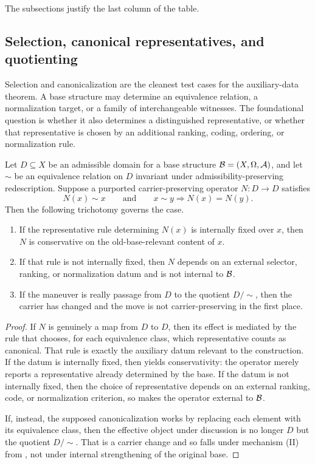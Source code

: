 The subsections justify the last column of the table.

\subsection{Selection, canonical representatives, and quotienting}

Selection and canonicalization are the cleanest test cases for the auxiliary-data theorem. A base structure may determine an equivalence relation, a normalization target, or a family of interchangeable witnesses. The foundational question is whether it also determines a distinguished representative, or whether that representative is chosen by an additional ranking, coding, ordering, or normalization rule.

\begin{proposition}\label{prop:case-canonicalization}
Let $D\subseteq X$ be an admissible domain for a base structure $\mathcal{B}=(X,\Omega,\mathcal{A})$, and let $\sim$ be an equivalence relation on $D$ invariant under admissibility-preserving redescription. Suppose a purported carrier-preserving operator $N:D\to D$ satisfies
\[
N(x)\sim x \qquad\text{and}\qquad x\sim y \Rightarrow N(x)=N(y).
\]
Then the following trichotomy governs the case.
\begin{enumerate}[label=(\alph*)]
    \item If the representative rule determining $N(x)$ is internally fixed over $x$, then $N$ is conservative on the old-base-relevant content of $x$.
    \item If that rule is not internally fixed, then $N$ depends on an external selector, ranking, or normalization datum and is not internal to $\mathcal{B}$.
    \item If the maneuver is really passage from $D$ to the quotient $D/{\sim}$, then the carrier has changed and the move is not carrier-preserving in the first place.
\end{enumerate}
\end{proposition}

\begin{proof}
If $N$ is genuinely a map from $D$ to $D$, then its effect is mediated by the rule that chooses, for each equivalence class, which representative counts as canonical. That rule is exactly the auxiliary datum relevant to the construction. If the datum is internally fixed, then  yields conservativity: the operator merely reports a representative already determined by the base. If the datum is not internally fixed, then the choice of representative depends on an external ranking, code, or normalization criterion, so  makes the operator external to $\mathcal{B}$.

If, instead, the supposed canonicalization works by replacing each element with its equivalence class, then the effective object under discussion is no longer $D$ but the quotient $D/{\sim}$. That is a carrier change and so falls under mechanism (II) from , not under internal strengthening of the original base.
\end{proof}


